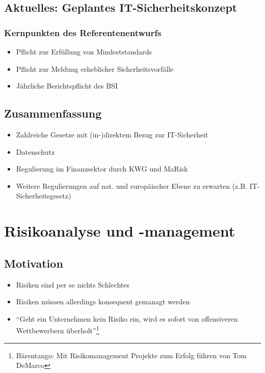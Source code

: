 \subsection{Aktuelles: Geplantes IT-Sicherheitskonzept}

\subsubsection{Kernpunkten des Referentenentwurfs}
\begin{itemize}
	\item Pflicht zur Erfüllung von Mindeststandards
	\item Pflicht zur Meldung erheblicher Sicherheitsvorfälle
	\item Jährliche Berichtspflicht des BSI
\end{itemize}


\subsection{Zusammenfassung}
\begin{itemize}
	\item Zahlreiche Gesetze mit (in-)direktem Bezug zur IT-Sicherheit
	\item Datenschutz
	\item Regulierung im Finanzsektor durch KWG und MaRisk
	\item Weitere Regulierungen auf nat. und europäischer Ebene zu erwarten (z.B. IT-Sicherheitsgesetz)
\end{itemize}

\section{Risikoanalyse und -management}

\subsection{Motivation}
\begin{itemize}
	\item Risiken sind per se nichts Schlechtes
	\item Risiken müssen allerdings konsequent gemanagt werden
	\item "`Geht ein Unternehmen kein Risiko ein, wird es sofort von offensiveren Wettbewerbern überholt"'\footnote{Bärentango: Mit Risikomanagement Projekte zum Erfolg führen von Tom DeMarco}
\end{itemize}


